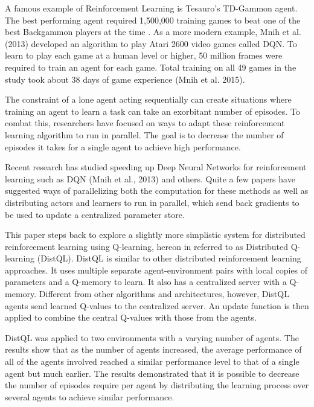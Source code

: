\documentclass[jair,twoside,11pt,theapa]{article}
\begin{document}
A famous example of Reinforcement Learning is Tesauro's TD-Gammon agent.
The best performing agent required 1,500,000 training games to beat one of the best Backgammon players at the time \cite{Tesauro:1995:TDL:203330.203343}.
As a more modern example, Mnih et al. (2013) \nocite{Mnih2013} developed an algorithm to play Atari 2600 video games called DQN. To learn to play each game at a human level or higher,
50 million frames were required to train an agent for each game. Total training on all 49 games in the study took about 38 days of game experience (Mnih et al. 2015). 

The constraint of a lone agent acting sequentially can create situations where training an agent to learn a task can take an exorbitant number of episodes. 
To combat this, researchers have focused on ways to adapt these reinforcement learning algorithm to run in parallel. The goal is to decrease the number of episodes it takes for a single agent to achieve high performance.

Recent research has studied speeding up Deep Neural Networks for reinforcement learning such as DQN (Mnih et al., 2013)\nocite{Mnih2013} and others. Quite a few papers have suggested ways of parallelizing both the computation for these methods as well as distributing actors and learners to run in parallel, which send back gradients to be used to update a centralized parameter store. 

This paper steps back to explore a slightly more simplistic system for distributed reinforcement learning using Q-learning, hereon in referred to as Distributed Q-learning (DistQL). DistQL is similar to other distributed reinforcement learning approaches. It uses multiple separate agent-environment pairs with local copies of parameters and a Q-memory to learn. It also has a centralized server with a Q-memory. Different from other algorithms and architectures, however, DistQL agents send learned Q-values to the centralized server. An update function is then applied to combine the central Q-values with those from the agents. 

DistQL was applied to two environments with a varying number of agents. The results show that as the number of agents increased, the average performance of all of the agents involved reached a similar performance level to that of a single agent but much earlier. The results demonstrated that it is possible to decrease the number of episodes require per agent by distributing the learning process over several agents to achieve similar performance.  
\end{document}
